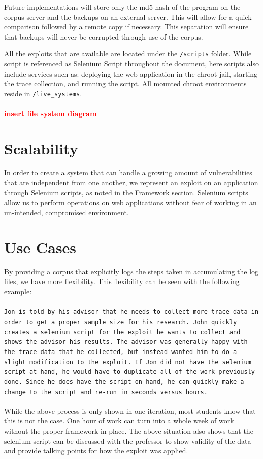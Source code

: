 \documentclass[letterpaper,twocolumn,10pt]{article}
\begin{document}
Future implementations will store only the md5 hash of the program on the corpus server and the backups on an external server.  This will allow for a quick comparison followed by a remote copy if necessary.  This separation will ensure that backups will never be corrupted through use of the corpus.  

All the exploits that are available are located under the {\tt /scripts} folder.  While script is referenced as Selenium Script throughout the document, here scripts also include services such as: deploying the web application in the chroot jail, starting the trace collection, and running the script. All mounted chroot environments reside in {\tt /live\_systems}. 
\\\\
\textcolor{red}{
{\bf insert file system diagram}
}


\section{Scalability}
In order to create a system that can handle a growing amount of vulnerabilities that are independent from one another, we represent an exploit on an application through  Selenium scripts, as noted in the Framework section.  Selenium scripts allow us to perform operations on web applications without fear of working in an un-intended, compromised environment. 

\section{Use Cases}
By providing a corpus that explicitly logs the steps taken in accumulating the log files, we have more flexibility.  This flexibility can be seen with the following example:  
\\\\
{\tt Jon is told by his advisor that he needs to collect more trace data in order to get a proper sample size for his research.  John quickly creates a selenium script for the exploit he wants to collect and shows the advisor his results.  The advisor was generally happy with the trace data that he collected, but instead wanted him to do a slight modification to the exploit.  If Jon did not have the selenium script at hand, he would have to duplicate all of the work previously done.  Since he does have the script on hand, he can quickly make a change to the script and re-run in seconds versus hours.}
\\\\
While the above process is only shown in one iteration, most students know that this is not the case.  One hour of work can turn into a whole week of work without the proper framework in place.  The above situation also shows that the selenium script can be discussed with the professor to show validity of the data and provide talking points for how the exploit was applied.
\end{document}
